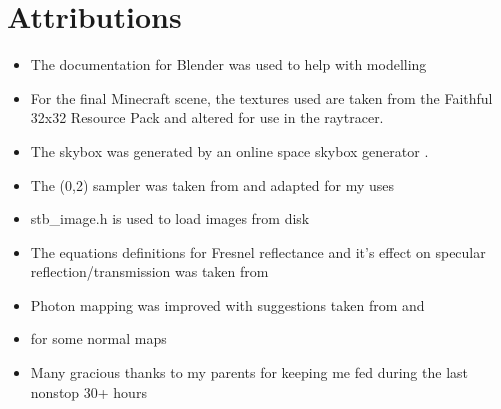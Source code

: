 \documentclass {article}
\begin{document}
\section{Attributions}
\begin{itemize}
    \item The documentation for Blender was used to help with modelling \cite{foundation_2020}
    \item For the final Minecraft scene, the textures used are taken from the
    Faithful 32x32 Resource Pack \cite{vattic_2020} and altered for use in the raytracer.
    \item The skybox was generated by an online space skybox generator \cite{terrell_2015}.
    \item The (0,2) sampler was taken from \cite{PBR} and adapted for my uses
    \item stb\_image.h \cite{barrett_2020} is used  to load images from disk
    \item The equations definitions for Fresnel reflectance and it's effect on 
    specular reflection/transmission was taken from \cite{PBR}
    \item Photon mapping was improved with suggestions taken from \cite{PBR} and
    \cite{jensen_1996}
    \item \cite{petry_2014} for some normal maps
    \item Many gracious thanks to my parents for keeping me fed during the last nonstop 30+ hours
\end{itemize}


{}
\end{document}
